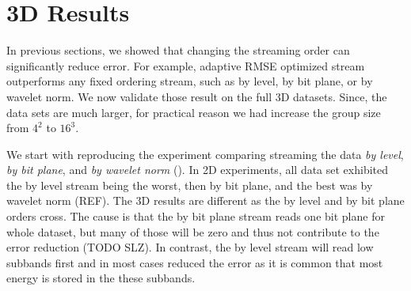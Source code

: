\section{3D Results}
In previous sections, we showed that changing the streaming order can significantly reduce error. For example,
adaptive RMSE optimized stream outperforms any fixed ordering stream, such as by level,
by bit plane, or by wavelet norm. We now validate those result on the full 3D datasets.
Since, the data sets are much larger, for
practical reason we had increase the group size from $4^2$ to $16^3$.

We start with reproducing the experiment comparing streaming the data \emph{by level}, \emph{by bit plane},
and \emph{by wavelet norm} (). In 2D experiments, all data set exhibited the by level stream
being the worst, then by bit plane, and the best was by wavelet norm (REF). The 3D results are different as
the by level and by bit plane orders cross. The cause is that the by bit plane stream reads one bit plane for whole
dataset, but many of those will be zero and thus not contribute to the error reduction (TODO SLZ). In contrast, the by
level stream will read low subbands first and in most cases reduced the error as it is common that most energy is stored in
the these subbands.

